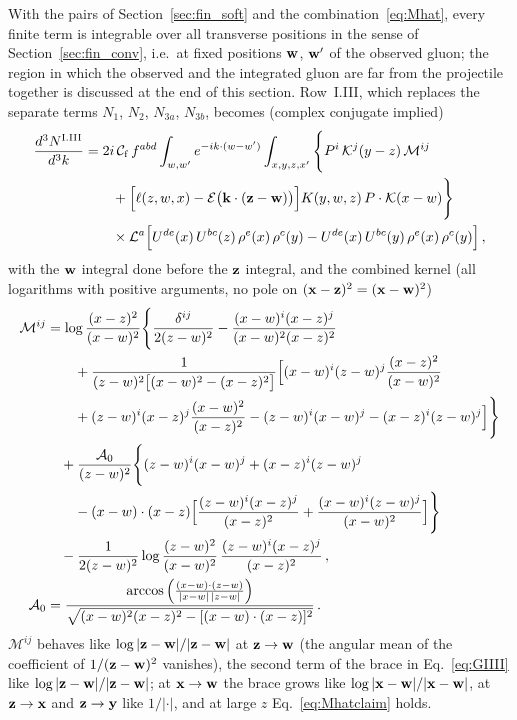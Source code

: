 With the pairs of Section~\ref{sec:fin_soft} and the combination~\eqref{eq:Mhat}, every finite term is integrable over all transverse positions in the sense of Section~\ref{sec:fin_conv}, i.e.\ at fixed positions $\mathbf{w}$, $\mathbf{w}'$ of the observed gluon; the region in which the observed and the integrated gluon are far from the projectile together is discussed at the end of this section. Row~I.III, which replaces the separate terms $N_1$, $N_2$, $N_{3a}$, $N_{3b}$, becomes (complex conjugate implied)
\begin{align}\label{eq:GIIII}
\frac{d^3N^{\rm I.III}}{d^3k}&=2i\,\mathcal C_{\rm f}\,f^{abd}\int_{w,w'}e^{-ik\cdot(w-w')}\int_{x,y,z,x'}\Bigg\{P^i\,\mathcal{K}^j(y-z)\,\mathcal M^{ij}\notag\\&\qquad+\Big[\ell(z,w,x)-\mathcal E\big(\mathbf{k}\cdot(\mathbf{z}-\mathbf{w})\big)\Big]K(y,w,z)\,P\cdot\mathcal{K}(x-w)\Bigg\}\notag\\
&\qquad\times\mathcal L^a\Big[U^{de}(x)\,U^{bc}(z)\,\rho^e(x)\,\rho^c(y)-U^{de}(x)\,U^{bc}(y)\,\rho^e(x)\,\rho^c(y)\Big]\,,
\end{align}
with the $\mathbf{w}$ integral done before the $\mathbf{z}$ integral, and the combined kernel (all logarithms with positive arguments, no pole on $(\mathbf{x}-\mathbf{z})^2=(\mathbf{x}-\mathbf{w})^2$)
\begin{align}\label{eq:Mij}
\mathcal M^{ij}&=\log\frac{(x-z)^2}{(x-w)^2}\Bigg\{\frac{\delta^{ij}}{2(z-w)^2}-\frac{(x-w)^i(x-z)^j}{(x-w)^2(x-z)^2}\notag\\
&\qquad+\frac{1}{(z-w)^2\big[(x-w)^2-(x-z)^2\big]}\Big[(x-w)^i(z-w)^j\frac{(x-z)^2}{(x-w)^2}\notag\\
&\qquad+(z-w)^i(x-z)^j\frac{(x-w)^2}{(x-z)^2}-(z-w)^i(x-w)^j-(x-z)^i(z-w)^j\Big]\Bigg\}\notag\\
&\quad+\frac{\mathcal A_0}{(z-w)^2}\Bigg\{(z-w)^i(x-w)^j+(x-z)^i(z-w)^j\notag\\&\qquad-(x-w)\cdot(x-z)\Big[\frac{(z-w)^i(x-z)^j}{(x-z)^2}+\frac{(x-w)^i(z-w)^j}{(x-w)^2}\Big]\Bigg\}\notag\\
&\quad-\frac{1}{2(z-w)^2}\log\frac{(z-w)^2}{(x-w)^2}\,\frac{(z-w)^i(x-z)^j}{(x-z)^2}\,,\notag\\
\mathcal A_0&=\frac{\arccos\Big(\frac{(x-w)\cdot(z-w)}{|x-w|\,|z-w|}\Big)}{\sqrt{(x-w)^2(x-z)^2-[(x-w)\cdot(x-z)]^2}}\,.
\end{align}
$\mathcal M^{ij}$ behaves like $\log|\mathbf{z}-\mathbf{w}|/|\mathbf{z}-\mathbf{w}|$ at $\mathbf{z}\to\mathbf{w}$ (the angular mean of the coefficient of $1/(\mathbf{z}-\mathbf{w})^2$ vanishes), the second term of the brace in Eq.~\eqref{eq:GIIII} like $\log|\mathbf{z}-\mathbf{w}|/|\mathbf{z}-\mathbf{w}|$; at $\mathbf{x}\to\mathbf{w}$ the brace grows like $\log|\mathbf{x}-\mathbf{w}|/|\mathbf{x}-\mathbf{w}|$, at $\mathbf{z}\to\mathbf{x}$ and $\mathbf{z}\to\mathbf{y}$ like $1/|\cdot|$, and at large $z$ Eq.~\eqref{eq:Mhatclaim} holds.

